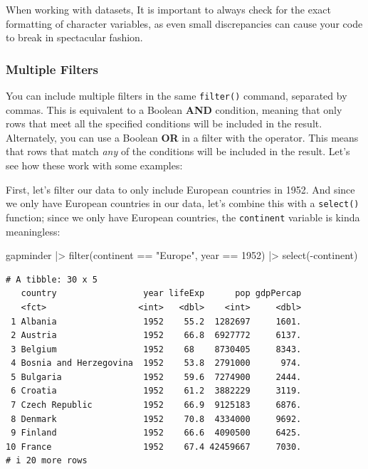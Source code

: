 \documentclass[
  letterpaper,
]{book}
\newenvironment{Shaded}{\begin{snugshade}}{\end{snugshade}}
\newcommand{\DecValTok}[1]{\textcolor[rgb]{0.68,0.00,0.00}{#1}}
\newcommand{\FunctionTok}[1]{\textcolor[rgb]{0.28,0.35,0.67}{#1}}
\newcommand{\NormalTok}[1]{\textcolor[rgb]{0.00,0.23,0.31}{#1}}
\newcommand{\SpecialCharTok}[1]{\textcolor[rgb]{0.37,0.37,0.37}{#1}}
\newcommand{\StringTok}[1]{\textcolor[rgb]{0.13,0.47,0.30}{#1}}
\begin{document}
When working with datasets, It is important to always check for the
exact formatting of character variables, as even small discrepancies can
cause your code to break in spectacular fashion.

\subsubsection{Multiple Filters}\label{multiple-filters}

You can include multiple filters in the same \texttt{filter()} command,
separated by commas. This is equivalent to a Boolean \textbf{AND}
condition, meaning that only rows that meet all the specified conditions
will be included in the result. Alternately, you can use a Boolean
\textbf{OR} in a filter with the \texttt{\textbar{}} operator. This
means that rows that match \emph{any} of the conditions will be included
in the result. Let's see how these work with some examples:

First, let's filter our data to only include European countries in 1952.
And since we only have European countries in our data, let's combine
this with a \texttt{select()} function; since we only have European
countries, the \texttt{continent} variable is kinda meaningless:

\begin{Shaded}
\begin{Highlighting}[]
\NormalTok{gapminder }\SpecialCharTok{|\textgreater{}} 
  \FunctionTok{filter}\NormalTok{(continent }\SpecialCharTok{==} \StringTok{"Europe"}\NormalTok{,}
\NormalTok{         year }\SpecialCharTok{==} \DecValTok{1952}\NormalTok{) }\SpecialCharTok{|\textgreater{}} 
  \FunctionTok{select}\NormalTok{(}\SpecialCharTok{{-}}\NormalTok{continent)}
\end{Highlighting}
\end{Shaded}

\begin{verbatim}
# A tibble: 30 x 5
   country                 year lifeExp      pop gdpPercap
   <fct>                  <int>   <dbl>    <int>     <dbl>
 1 Albania                 1952    55.2  1282697     1601.
 2 Austria                 1952    66.8  6927772     6137.
 3 Belgium                 1952    68    8730405     8343.
 4 Bosnia and Herzegovina  1952    53.8  2791000      974.
 5 Bulgaria                1952    59.6  7274900     2444.
 6 Croatia                 1952    61.2  3882229     3119.
 7 Czech Republic          1952    66.9  9125183     6876.
 8 Denmark                 1952    70.8  4334000     9692.
 9 Finland                 1952    66.6  4090500     6425.
10 France                  1952    67.4 42459667     7030.
# i 20 more rows
\end{verbatim}
\end{document}
